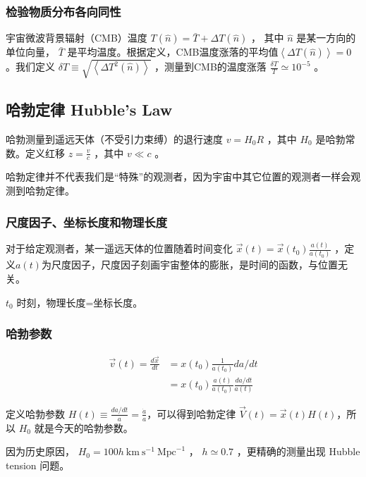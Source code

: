 \documentclass[]{ctexart}
\begin{document}
\subsubsection{检验物质分布各向同性}

宇宙微波背景辐射（CMB）温度 $T (\hat{n}) = \bar{T} + \Delta T (\hat{n})$ ， 其中 $\hat{n}$ 是某一方向的单位向量， $\bar{T}$ 是平均温度。根据定义，CMB温度涨落的平均值$\left\langle \Delta T (\hat{n}) \right\rangle = 0$ 。我们定义 $\delta T \equiv \sqrt{\left\langle \Delta T^2 (\hat{n}) \right\rangle}$  ，测量到CMB的温度涨落 $\frac{\delta T}{T} \simeq 10^{-5}$ 。

\subsection{哈勃定律 Hubble's Law}

哈勃测量到遥远天体（不受引力束缚）的退行速度 $v=H_0 R$ ，其中 $H_0$ 是哈勃常数。定义红移 $z=\frac{v}{c}$ ，其中 $v \ll c$ 。 

哈勃定律并不代表我们是“特殊”的观测者，因为宇宙中其它位置的观测者一样会观测到哈勃定律。

\subsubsection{尺度因子、坐标长度和物理长度}

对于给定观测者，某一遥远天体的位置随着时间变化 $\vec{x}(t) = \vec{x} (t_0) \frac{a(t)}{a(t_0)}$ ，定义$a(t)$为尺度因子，尺度因子刻画宇宙整体的膨胀，是时间的函数，与位置无关。

$t_0$ 时刻，物理长度=坐标长度。

\subsubsection{哈勃参数}


$$\begin{aligned} \vec{v}(t)=\frac{d \vec{x}}{d t} &=x\left(t_{0}\right) \frac{1}{a\left(t_{0}\right)} d a / d t \\ &=x\left(t_{0}\right) \frac{a(t)}{a\left(t_{0}\right)} \frac{d a / d t}{a(t)} \end{aligned}$$

定义哈勃参数 $H(t) \equiv \frac{da/dt}{a} = \frac{\dot{a}}{a}$，可以得到哈勃定律 $\vec{V}(t)=\vec{x}(t)H(t)$，所以 $H_0$ 就是今天的哈勃参数。


因为历史原因， $H_0 = 100 h \mathrm{~km} \mathrm{~s}^{-1} \mathrm{~Mpc}^{-1}$ ， $h \simeq 0.7$ ，更精确的测量出现 Hubble tension 问题。
\end{document}
